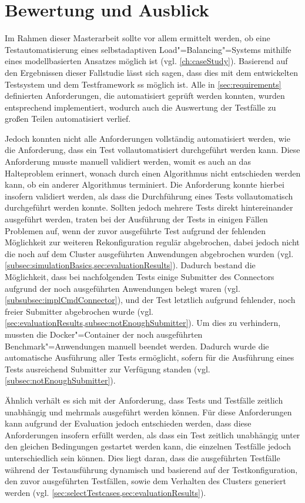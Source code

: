 \section{Bewertung und Ausblick}
\label{sec:outlook}

Im Rahmen dieser Masterarbeit sollte vor allem ermittelt werden, ob eine Testautomatisierung eines selbstadaptiven Load"=Balancing"=Systems mithilfe eines modellbasierten Ansatzes möglich ist (vgl. \cref{ch:caseStudy}).
Basierend auf den Ergebnissen dieser Fallstudie lässt sich sagen, dass dies mit dem entwickelten Testsystem und dem Testframework \gls{ss} möglich ist.
Alle in \cref{sec:requirements} definierten Anforderungen, die automatisiert geprüft werden konnten, wurden entsprechend implementiert, wodurch auch die Auswertung der Testfälle zu großen Teilen automatisiert verlief.

Jedoch konnten nicht alle Anforderungen vollständig automatisiert werden, wie \zB die Anforderung, dass ein Test vollautomatisiert durchgeführt werden kann.
Diese Anforderung musste manuell validiert werden, womit es auch an das Halteproblem \cite{Turing1937,Turing1938} erinnert, wonach durch einen Algorithmus nicht entschieden werden kann, ob ein anderer Algorithmus terminiert.
Die Anforderung konnte hierbei insofern validiert werden, als dass die Durchführung eines Tests vollautomatisch durchgeführt werden konnte.
Sollten jedoch mehrere Tests direkt hintereinander ausgeführt werden, traten bei der Ausführung der Tests in einigen Fällen Problemen auf, wenn der zuvor ausgeführte Test aufgrund der fehlenden Möglichkeit zur weiteren Rekonfiguration regulär abgebrochen, dabei jedoch nicht die noch auf dem Cluster ausgeführten Anwendungen abgebrochen wurden (vgl. \cref{subsec:simulationBasics,sec:evaluationResults}).
Dadurch bestand die Möglichkeit, dass bei nachfolgenden Tests einige Submitter des Connectors aufgrund der noch ausgeführten Anwendungen belegt waren (vgl. \cref{subsubsec:implCmdConnector}), und der Test letztlich aufgrund fehlender, noch freier Submitter abgebrochen wurde (vgl. \cref{sec:evaluationResults,subsec:notEnoughSubmitter}).
Um dies zu verhindern, mussten die Docker"=Container der noch ausgeführten Benchmark"=Anwendungen manuell beendet werden.
Dadurch wurde die automatische Ausführung aller Tests ermöglicht, sofern für die Ausführung eines Tests ausreichend Submitter zur Verfügung standen (vgl. \cref{subsec:notEnoughSubmitter}).

Ähnlich verhält es sich mit der Anforderung, dass Tests und Testfälle zeitlich unabhängig und mehrmals ausgeführt werden können.
Für diese Anforderungen kann aufgrund der Evaluation jedoch entschieden werden, dass diese Anforderungen insofern erfüllt werden, als dass ein Test zeitlich unabhängig unter den gleichen Bedingungen gestartet werden kann, die einzelnen Testfälle jedoch unterschiedlich sein können.
Dies liegt daran, dass die ausgeführten Testfälle während der Testausführung dynamisch und basierend auf der Testkonfiguration, den zuvor ausgeführten Testfällen, sowie dem Verhalten des Clusters generiert werden (vgl. \cref{sec:selectTestcases,sec:evaluationResults}).

